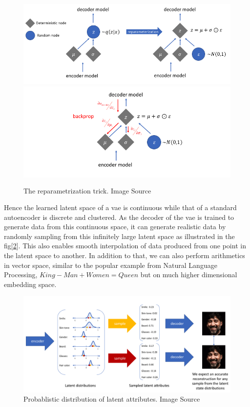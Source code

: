 \begin{figure}[!h]
    \centering
    \includegraphics[scale=0.5]{figures/reparametrization_trick.png}
    \includegraphics[scale=0.5]{figures/rep_trick.png}
    \caption{The reparametrization trick. Image Source \cite{jeremy_jordan_2018}}
    \label{fig:reparametrization_trick}
\end{figure}

Hence the learned latent space of a \ac{vae} is continuous while that of a standard autoencoder is discrete and clustered. As the decoder of the \ac{vae} is trained to generate data from this continuous space, it can generate realistic data by randomly sampling from this infinitely large latent space as illustrated in the fig[\ref{fig:vae_latent_attribute}]. This also enables smooth interpolation of data produced from one point in the latent space to another. In addition to that, we can also perform arithmetics in vector space, similar to the popular example from Natural Language Processing, $King - Man + Women = Queen$ but on much higher dimensional embedding space.

\begin{figure}[!h]
    \centering
    \includegraphics[scale=0.4]{figures/vae_latent_attribute.png}
    \caption{Probablistic distribution of latent attributes. Image Source \cite{jeremy_jordan_2018}}
    \label{fig:vae_latent_attribute}
\end{figure}

